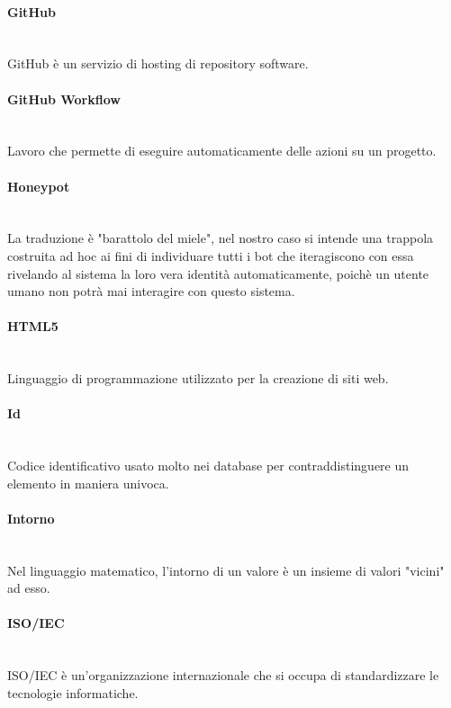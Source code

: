 \paragraph{GitHub}~\smallskip \\
GitHub è un servizio di hosting di repository software.

\paragraph{GitHub Workflow}~\smallskip \\
Lavoro che permette di eseguire automaticamente delle azioni su un progetto.

\paragraph{Honeypot}~\smallskip \\
La traduzione è "barattolo del miele", nel nostro caso si intende una trappola costruita ad hoc ai fini di individuare tutti i bot che iteragiscono con essa rivelando al sistema la loro vera identità automaticamente, poichè un utente umano non potrà mai interagire con questo sistema.

\paragraph{HTML5}~\smallskip \\
Linguaggio di programmazione utilizzato per la creazione di siti web.

\paragraph{Id}~\smallskip \\
Codice identificativo usato molto nei database per contraddistinguere un elemento in maniera univoca.

\paragraph{Intorno}~\smallskip \\
Nel linguaggio matematico, l'intorno di un valore è un insieme di valori "vicini" ad esso.

\paragraph{ISO/IEC}~\smallskip \\
ISO/IEC è un'organizzazione internazionale che si occupa di standardizzare le tecnologie informatiche.

